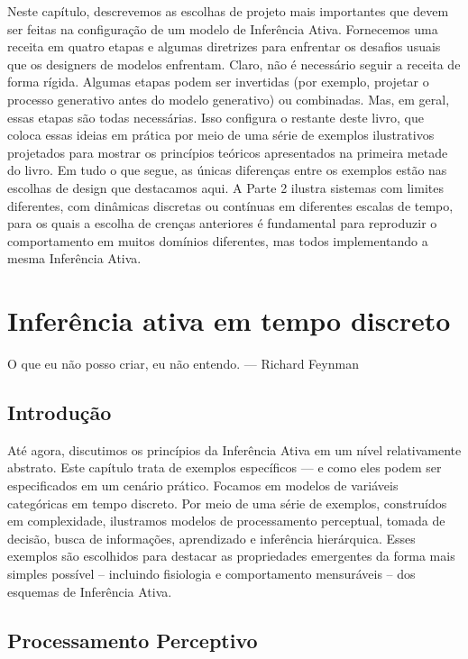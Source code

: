 \documentclass[
  12pt,
]{book}
\begin{document}
Neste capítulo, descrevemos as escolhas de projeto mais importantes que devem ser feitas na configuração de um modelo de Inferência Ativa. Fornecemos uma receita em quatro etapas e algumas diretrizes para enfrentar os desafios usuais que os designers de modelos enfrentam. Claro, não é necessário seguir a receita de forma rígida. Algumas etapas podem ser invertidas (por exemplo, projetar o processo generativo antes do modelo generativo) ou combinadas. Mas, em geral, essas etapas são todas necessárias. Isso configura o restante deste livro, que coloca essas ideias em prática por meio de uma série de exemplos ilustrativos projetados para mostrar os princípios teóricos apresentados na primeira metade do livro. Em tudo o que segue, as únicas diferenças entre os exemplos estão nas escolhas de design que destacamos aqui. A Parte 2 ilustra sistemas com limites diferentes, com dinâmicas discretas ou contínuas em diferentes escalas de tempo, para os quais a escolha de crenças anteriores é fundamental para reproduzir o comportamento em muitos domínios diferentes, mas todos implementando a mesma Inferência Ativa.

\hypertarget{inferuxeancia-ativa-em-tempo-discreto-1}{%
\chapter{Inferência ativa em tempo discreto}\label{inferuxeancia-ativa-em-tempo-discreto-1}}

O que eu não posso criar, eu não entendo. --- Richard Feynman

\hypertarget{introduuxe7uxe3o-6}{%
\section{Introdução}\label{introduuxe7uxe3o-6}}

Até agora, discutimos os princípios da Inferência Ativa em um nível relativamente abstrato. Este capítulo trata de exemplos específicos --- e como eles podem ser especificados em um cenário prático. Focamos em modelos de variáveis categóricas em tempo discreto. Por meio de uma série de exemplos, construídos em complexidade, ilustramos modelos de processamento perceptual, tomada de decisão, busca de informações, aprendizado e inferência hierárquica. Esses exemplos são escolhidos para destacar as propriedades emergentes da forma mais simples possível -- incluindo fisiologia e comportamento mensuráveis -- dos esquemas de Inferência Ativa.

\hypertarget{processamento-perceptivo}{%
\section{Processamento Perceptivo}\label{processamento-perceptivo}}
\end{document}
